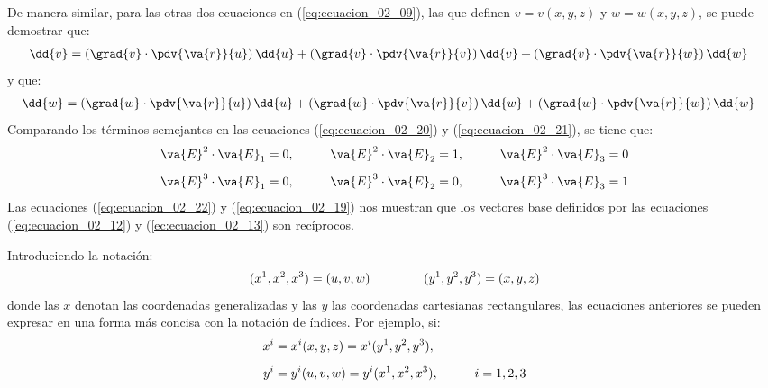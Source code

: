 De manera similar, para las otras dos ecuaciones en (\ref{eq:ecuacion_02_09}), las que definen $v = v(x, y, z)$ y $w = w (x, y, z)$, se puede demostrar que:
\begin{align}
\dd{v} &= \left( \grad{v} \cdot \pdv{\va{r}}{u} \right) \dd{u} + \left( \grad{v} \cdot \pdv{\va{r}}{v} \right) \dd{v} + \left( \grad{v} \cdot \pdv{\va{r}}{w} \right) \dd{w}
\label{eq:ecuacion_02_20}
\end{align}
y que:
\begin{align}
\dd{w} &= \left( \grad{w} \cdot \pdv{\va{r}}{u} \right) \dd{u} + \left( \grad{w} \cdot \pdv{\va{r}}{v} \right) \dd{w} + \left( \grad{w} \cdot \pdv{\va{r}}{w} \right) \dd{w}
\label{eq:ecuacion_02_21}
\end{align}
Comparando los términos semejantes en las ecuaciones (\ref{eq:ecuacion_02_20}) y (\ref{eq:ecuacion_02_21}), se tiene que:
\begin{align}
\begin{aligned}
\va{E}^{2} \cdot \va{E}_{1} &= 0, \hspace{1cm} \va{E}^{2} \cdot \va{E}_{2} = 1, \hspace{1cm} \va{E}^{2} \cdot \va{E}_{3} = 0 \\[0.5em]
\va{E}^{3} \cdot \va{E}_{1} &= 0, \hspace{1cm} \va{E}^{3} \cdot \va{E}_{2} = 0, \hspace{1cm} \va{E}^{3} \cdot \va{E}_{3} = 1
\end{aligned}
\label{eq:ecuacion_02_22}
\end{align}
Las ecuaciones (\ref{eq:ecuacion_02_22}) y (\ref{eq:ecuacion_02_19}) nos muestran que los vectores base definidos por las ecuaciones (\ref{eq:ecuacion_02_12}) y (\ref{ec:ecuacion_02_13}) son recíprocos.
\par
Introduciendo la notación:
\begin{align}
(x^{1}, x^{2}, x^{3}) = (u, v, w) \hspace{1.5cm} (y^{1}, y^{2}, y^{3}) = (x, y, z)
\label{eq:ecuacion_02_23}
\end{align}
donde las $x$ denotan las coordenadas generalizadas y las $y$ las coordenadas cartesianas rectangulares, las ecuaciones anteriores se pueden expresar en una forma más concisa con la notación de índices. Por ejemplo, si:
\begin{align}
\begin{aligned}
x^{i} &= x^{i} (x, y, z) = x^{i} (y^{1}, y^{2}, y^{3}), \hspace{0.5cm} \\[0.5em]y^{i} &= y^{i} (u, v, w) = y^{i} (x^{1}, x^{2}, x^{3}), \hspace{1cm} i = 1, 2, 3
\end{aligned}
\label{ec:ecuacion_02_24}
\end{align}
